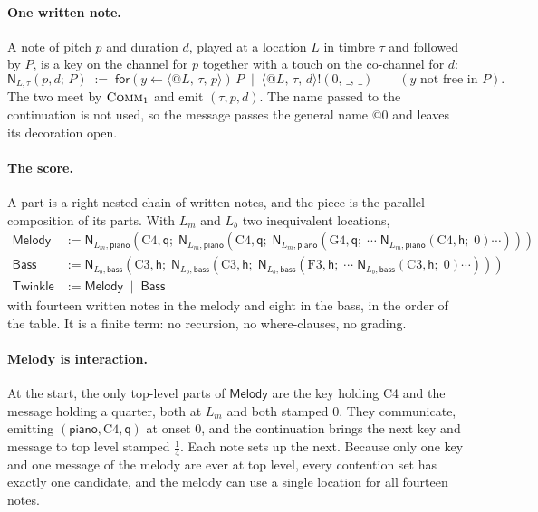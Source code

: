 \documentclass[11pt,a4paper]{article}
\makeatletter
\theoremstyle{plain}
\theoremstyle{definition}
\theoremstyle{remark}
\let\oldsc\textsc
\renewcommand{\textsc}[1]{\textup{\oldsc{#1}}}
\newcommand{\nm}[3]{\langle @#1,\,#2,\,#3\rangle}
\newcommand{\snd}[4]{#1!(#2,\,#3,\,#4)}
\newcommand{\rcv}[3]{\mathsf{for}(#1 \leftarrow #2)\,#3}
\newcommand{\wild}{\_}
\makeatother
\begin{document}
\paragraph{One written note.} A note of pitch $p$ and duration $d$, played at a
location $L$ in timbre $\tau$ and followed by $P$, is a key on the channel for
$p$ together with a touch on the co-channel for $d$:
\[
\mathsf{N}_{L,\tau}(p, d;\, P) \;:=\;
  \rcv{y}{\nm{L}{\tau}{p}}{P} \;\mid\; \snd{\nm{L}{\tau}{d}}{0}{\wild}{\wild}
\qquad (y \text{ not free in } P).
\]
The two meet by $\textsc{Comm}_1$ and emit $(\tau, p, d)$. The name passed to
the continuation is not used, so the message passes the general name $@0$ and
leaves its decoration open.

\paragraph{The score.} A part is a right-nested chain of written notes, and the
piece is the parallel composition of its parts. With $L_m$ and $L_b$ two
inequivalent locations,
\begin{align*}
\mathsf{Melody} &:= \mathsf{N}_{L_m,\mathsf{piano}}(\mathrm{C4},\mathsf{q};\;
  \mathsf{N}_{L_m,\mathsf{piano}}(\mathrm{C4},\mathsf{q};\;
  \mathsf{N}_{L_m,\mathsf{piano}}(\mathrm{G4},\mathsf{q};\; \cdots\;
  \mathsf{N}_{L_m,\mathsf{piano}}(\mathrm{C4},\mathsf{h};\; 0)\cdots))) \\
\mathsf{Bass} &:= \mathsf{N}_{L_b,\mathsf{bass}}(\mathrm{C3},\mathsf{h};\;
  \mathsf{N}_{L_b,\mathsf{bass}}(\mathrm{C3},\mathsf{h};\;
  \mathsf{N}_{L_b,\mathsf{bass}}(\mathrm{F3},\mathsf{h};\; \cdots\;
  \mathsf{N}_{L_b,\mathsf{bass}}(\mathrm{C3},\mathsf{h};\; 0)\cdots))) \\
\mathsf{Twinkle} &:= \mathsf{Melody} \;\mid\; \mathsf{Bass}
\end{align*}
with fourteen written notes in the melody and eight in the bass, in the order of
the table. It is a finite term: no recursion, no where-clauses, no grading.

\paragraph{Melody is interaction.} At the start, the only top-level parts of
$\mathsf{Melody}$ are the key holding C4 and the message holding a quarter,
both at $L_m$ and both stamped $0$. They communicate, emitting
$(\mathsf{piano},\mathrm{C4},\mathsf{q})$ at onset $0$, and the continuation
brings the next key and message to top level stamped $\tfrac14$. Each note
sets up the next. Because only one key and one message of the melody are ever
at top level, every contention set has exactly one candidate, and the melody can
use a single location for all fourteen notes.
\end{document}
